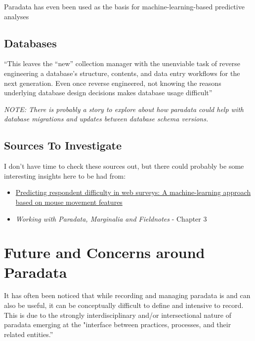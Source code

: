 \documentclass[class=article, crop=false]{standalone}
\begin{document}
Paradata has even been used as the basis for machine-learning-based predictive analyses \cite{fernandez2020predicting}

\subsection{Databases}

“This leaves the “new” collection manager with the unenviable task of reverse engineering a database’s structure, contents, and data entry workflows for the next generation. Even once reverse engineered, not knowing the reasons underlying database design decisions makes database usage difficult” \cite{rayburn2024reconstructing}

\textit{
  NOTE: There is probably a story to explore about how paradata could help with database migrations and updates between database schema versions. 
}

\subsection{Sources To Investigate}

I don't have time to check these sources out, but there could probably be some interesting insights here to be had from:

\begin{itemize}
  \item \href{https://journals.sagepub.com/doi/full/10.1177/08944393211032950}{Predicting respondent difficulty in web surveys: A machine-learning approach based on mouse movement features} 

  \item \textit{Working with Paradata, Marginalia and Fieldnotes} - Chapter 3
\end{itemize}


\section{Future and Concerns around Paradata}
\label{first}

It has often been noticed that while recording and managing paradata is and can also be useful, it can be conceptually difficult to define and intensive to record.
This is due to the strongly interdisciplinary and/or intersectional nature of paradata emerging at the "interface between practices, processes, and their related entities.” \cite{huvilaPerspectivesParadataResearch2024}
\end{document}
